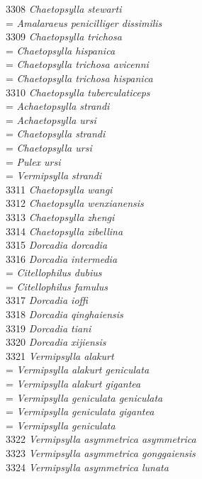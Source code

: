 \documentclass[
]{article}
\begin{document}
3308 \emph{Chaetopsylla stewarti}\\
= \emph{Amalaraeus penicilliger dissimilis}\\
3309 \emph{Chaetopsylla trichosa}\\
= \emph{Chaetopsylla hispanica}\\
= \emph{Chaetopsylla trichosa avicenni}\\
= \emph{Chaetopsylla trichosa hispanica}\\
3310 \emph{Chaetopsylla tuberculaticeps}\\
= \emph{Achaetopsylla strandi}\\
= \emph{Achaetopsylla ursi}\\
= \emph{Chaetopsylla strandi}\\
= \emph{Chaetopsylla ursi}\\
= \emph{Pulex ursi}\\
= \emph{Vermipsylla strandi}\\
3311 \emph{Chaetopsylla wangi}\\
3312 \emph{Chaetopsylla wenxianensis}\\
3313 \emph{Chaetopsylla zhengi}\\
3314 \emph{Chaetopsylla zibellina}\\
3315 \emph{Dorcadia dorcadia}\\
3316 \emph{Dorcadia intermedia}\\
= \emph{Citellophilus dubius}\\
= \emph{Citellophilus famulus}\\
3317 \emph{Dorcadia ioffi}\\
3318 \emph{Dorcadia qinghaiensis}\\
3319 \emph{Dorcadia tiani}\\
3320 \emph{Dorcadia xijiensis}\\
3321 \emph{Vermipsylla alakurt}\\
= \emph{Vermipsylla alakurt geniculata}\\
= \emph{Vermipsylla alakurt gigantea}\\
= \emph{Vermipsylla geniculata geniculata}\\
= \emph{Vermipsylla geniculata gigantea}\\
= \emph{Vermipsylla geniculata}\\
3322 \emph{Vermipsylla asymmetrica asymmetrica}\\
3323 \emph{Vermipsylla asymmetrica gonggaiensis}\\
3324 \emph{Vermipsylla asymmetrica lunata}\\
\end{document}
